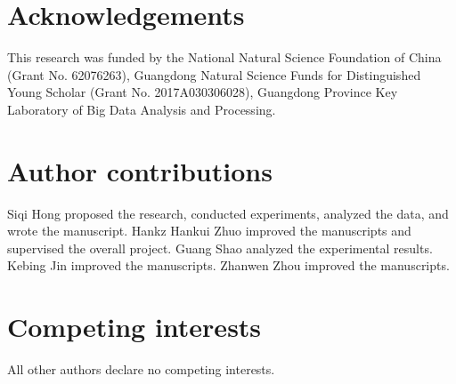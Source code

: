 \documentclass[sn-mathphys,Numbered]{sn-jnl}
\begin{document}
\clearpage

\section{Acknowledgements}

This research was funded by the National Natural Science Foundation of China (Grant No. 62076263), Guangdong Natural Science Funds for Distinguished Young Scholar (Grant No. 2017A030306028), Guangdong Province Key Laboratory of Big Data Analysis and Processing. 



\section{Author contributions}
Siqi Hong proposed the research, conducted experiments, analyzed the data, and wrote the manuscript. 
Hankz Hankui Zhuo improved the manuscripts and supervised the overall project.
Guang Shao analyzed the experimental results.
Kebing Jin improved the manuscripts.
Zhanwen Zhou improved the manuscripts.

\section{Competing interests}
All other authors declare no competing interests.
\end{document}
